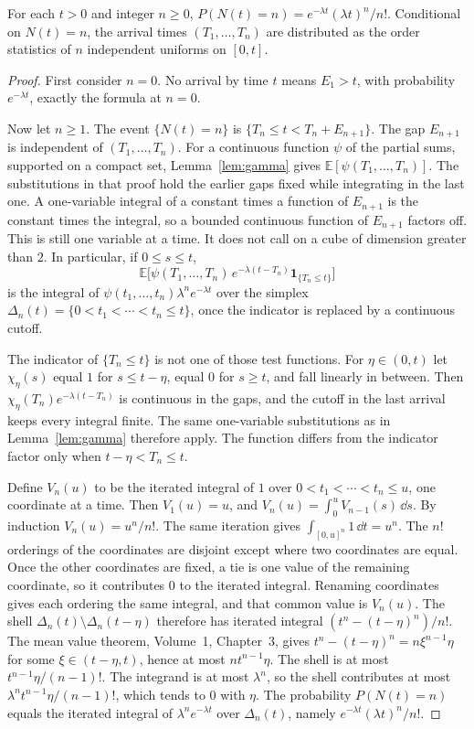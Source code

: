 \begin{theorem}\label{thm:uniform}
For each $t>0$ and integer $n\ge0$, $P(N(t)=n)=e^{-\lambda t}(\lambda t)^n/n!$. Conditional on $N(t)=n$, the arrival times $(T_1,\ldots,T_n)$ are distributed as the order statistics of $n$ independent uniforms on $[0,t]$.
\end{theorem}
\begin{proof}
First consider $n=0$. No arrival by time $t$ means $E_1>t$, with probability $e^{-\lambda t}$, exactly the formula at $n=0$.

Now let $n\ge1$. The event $\{N(t)=n\}$ is $\{T_n\le t<T_n+E_{n+1}\}$. The gap $E_{n+1}$ is independent of $(T_1,\ldots,T_n)$. For a continuous function $\psi$ of the partial sums, supported on a compact set, Lemma~\ref{lem:gamma} gives $\mathbb E[\psi(T_1,\ldots,T_n)]$. The substitutions in that proof hold the earlier gaps fixed while integrating in the last one. A one-variable integral of a constant times a function of $E_{n+1}$ is the constant times the integral, so a bounded continuous function of $E_{n+1}$ factors off. This is still one variable at a time. It does not call on a cube of dimension greater than $2$. In particular, if $0\le s\le t$,
\[
 \mathbb E\bigl[\psi(T_1,\ldots,T_n)\,e^{-\lambda(t-T_n)}\mathbf 1_{\{T_n\le t\}}\bigr]
\]
is the integral of $\psi(t_1,\ldots,t_n)\lambda^n e^{-\lambda t}$ over the simplex $\Delta_n(t)=\{0<t_1<\cdots<t_n\le t\}$, once the indicator is replaced by a continuous cutoff.

The indicator of $\{T_n\le t\}$ is not one of those test functions. For $\eta\in(0,t)$ let $\chi_\eta(s)$ equal $1$ for $s\le t-\eta$, equal $0$ for $s\ge t$, and fall linearly in between. Then $\chi_\eta(T_n)e^{-\lambda(t-T_n)}$ is continuous in the gaps, and the cutoff in the last arrival keeps every integral finite. The same one-variable substitutions as in Lemma~\ref{lem:gamma} therefore apply. The function differs from the indicator factor only when $t-\eta<T_n\le t$.

Define $V_n(u)$ to be the iterated integral of $1$ over $0<t_1<\cdots<t_n\le u$, one coordinate at a time. Then $V_1(u)=u$, and $V_n(u)=\int_0^u V_{n-1}(s)\,\dd s$. By induction $V_n(u)=u^n/n!$. The same iteration gives $\int_{[0,u]^n}1\,\dd t=u^n$. The $n!$ orderings of the coordinates are disjoint except where two coordinates are equal. Once the other coordinates are fixed, a tie is one value of the remaining coordinate, so it contributes $0$ to the iterated integral. Renaming coordinates gives each ordering the same integral, and that common value is $V_n(u)$. The shell $\Delta_n(t)\setminus\Delta_n(t-\eta)$ therefore has iterated integral $(t^n-(t-\eta)^n)/n!$. The mean value theorem, Volume~1, Chapter~3, gives $t^n-(t-\eta)^n=n\xi^{n-1}\eta$ for some $\xi\in(t-\eta,t)$, hence at most $n t^{n-1}\eta$. The shell is at most $t^{n-1}\eta/(n-1)!$. The integrand is at most $\lambda^n$, so the shell contributes at most $\lambda^n t^{n-1}\eta/(n-1)!$, which tends to $0$ with $\eta$. The probability $P(N(t)=n)$ equals the iterated integral of $\lambda^n e^{-\lambda t}$ over $\Delta_n(t)$, namely $e^{-\lambda t}(\lambda t)^n/n!$.


\end{proof}
